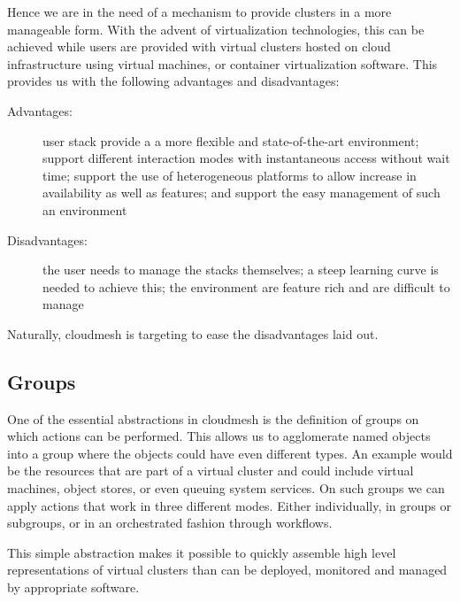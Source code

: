  Hence we are in the need of a mechanism to provide
clusters in a more manageable form. With the advent of virtualization
technologies, this can be achieved while users are provided with
virtual clusters hosted on cloud infrastructure using virtual machines,
or container virtualization software. This provides us with the
following advantages and disadvantages:

\begin{description}

\item[Advantages:] user stack provide a a more flexible and
  state-of-the-art environment; support different interaction modes
  with instantaneous access without wait time; support the use of
  heterogeneous platforms to allow increase in availability as well as
  features; and support the easy management of such an environment

\item[Disadvantages:] the user needs to manage the stacks themselves; a
  steep learning curve is needed to achieve this; the environment are
  feature rich and are difficult to manage

\end{description}

Naturally, cloudmesh is targeting to ease the disadvantages laid out.

\subsection{Groups} \label{S:groups}

One of the essential abstractions in cloudmesh is the definition of
groups on which actions can be performed. This allows us to
agglomerate named objects into a group where the objects could have
even different types. An example would be the resources that are part
of a virtual cluster and could include virtual machines, object stores,
or even queuing system services. On such groups we can apply actions
that work in three different modes. Either individually, in groups or
subgroups, or in an orchestrated fashion through workflows.

This simple abstraction makes it possible to quickly assemble high
level representations of virtual clusters than can be deployed,
monitored and managed by appropriate software. 


